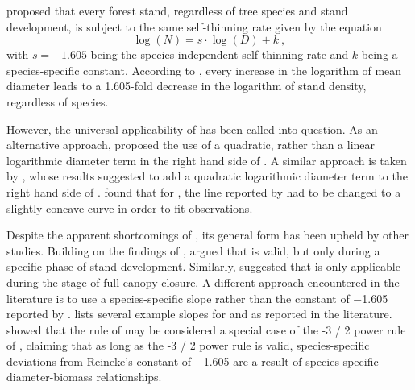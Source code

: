\textcite{Reineke1933} proposed that every forest stand, regardless of tree species and stand development, is subject to the same self-thinning rate given by the equation
\begin{equation}
  \label{eq:Reineke}
  \log (N) = s \cdot \log (D) + k ~,
\end{equation}
with \(s = -1.605\) being the species-independent self-thinning rate and \(k\) being a species-specific constant.  According to \textcite{Reineke1933}, every increase in the logarithm of mean diameter leads to a \num{1.605}-fold decrease in the logarithm of stand density, regardless of species.

However, the universal applicability of  has been called into question.  As an alternative approach, \textcite{Charru2012} proposed the use of a quadratic, rather than a linear logarithmic diameter term in the right hand side of . A similar approach is taken by \textcite{Schuetz2008,Schuetz2010,Zeide1995}, whose results suggested to add a quadratic logarithmic diameter term to the right hand side of .  \textcite{Meyer1938} found that for \Ponderosa{}, the line reported by \textcite{Reineke1933} had to be changed to a slightly concave curve in order to fit observations.  

Despite the apparent shortcomings of , its general form has been upheld by other studies.  Building on the findings of \textcite{Drew1979}, \textcite{VanderSchaaf2010,VanderSchaaf2008} argued that  is valid, but only during a specific phase of stand development.  Similarly, \textcite{Zeide1985} suggested that  is only applicable during the stage of full canopy closure.  A different approach encountered in the literature is to use a species-specific slope rather than the constant of \num{-1.605} reported by \textcite{Reineke1933} \parencite{MacKinney1935,Pretzsch2005,Charru2012,Pretzsch2006,Río2001,Sterba1987,Vacchiano2013,Vospernik2015,Zeide1985,Zeide1987,VanderSchaaf2007}.   lists several example slopes for \Beech{} and \Spruce{} as reported in the literature.  \textcite{Pretzsch2000,Pretzsch2002} showed that the rule of \textcite{Reineke1933} may be considered a special case of the \num{-3 / 2} power rule of \textcite{Yoda1963}, claiming that as long as the \num{-3 / 2} power rule is valid, species-specific deviations from Reineke’s constant of \num{-1.605} are a result of species-specific diameter-biomass relationships.

